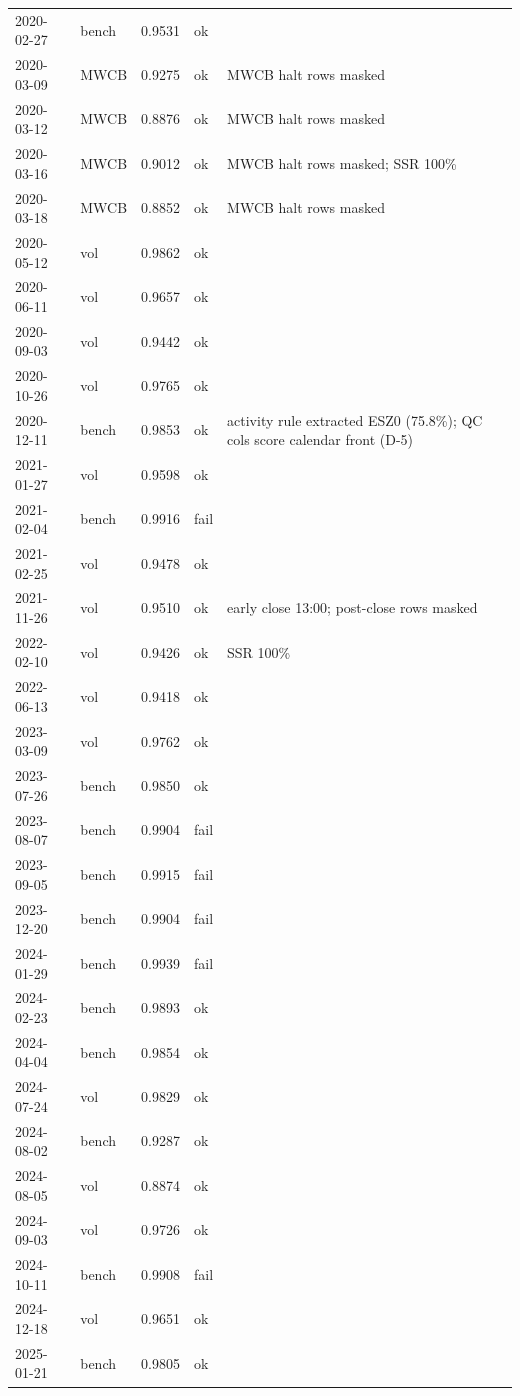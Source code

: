 \begin{table}[htbp]
\begin{tabular}{lllll}
2020-02-27 & bench & 0.9531 & ok &  \\
2020-03-09 & MWCB & 0.9275 & ok & MWCB halt rows masked \\
2020-03-12 & MWCB & 0.8876 & ok & MWCB halt rows masked \\
2020-03-16 & MWCB & 0.9012 & ok & MWCB halt rows masked; SSR 100\% \\
2020-03-18 & MWCB & 0.8852 & ok & MWCB halt rows masked \\
2020-05-12 & vol & 0.9862 & ok &  \\
2020-06-11 & vol & 0.9657 & ok &  \\
2020-09-03 & vol & 0.9442 & ok &  \\
2020-10-26 & vol & 0.9765 & ok &  \\
2020-12-11 & bench & 0.9853 & ok & activity rule extracted ESZ0 (75.8\%); QC cols score calendar front (D-5) \\
2021-01-27 & vol & 0.9598 & ok &  \\
2021-02-04 & bench & 0.9916 & fail &  \\
2021-02-25 & vol & 0.9478 & ok &  \\
2021-11-26 & vol & 0.9510 & ok & early close 13:00; post-close rows masked \\
2022-02-10 & vol & 0.9426 & ok & SSR 100\% \\
2022-06-13 & vol & 0.9418 & ok &  \\
2023-03-09 & vol & 0.9762 & ok &  \\
2023-07-26 & bench & 0.9850 & ok &  \\
2023-08-07 & bench & 0.9904 & fail &  \\
2023-09-05 & bench & 0.9915 & fail &  \\
2023-12-20 & bench & 0.9904 & fail &  \\
2024-01-29 & bench & 0.9939 & fail &  \\
2024-02-23 & bench & 0.9893 & ok &  \\
2024-04-04 & bench & 0.9854 & ok &  \\
2024-07-24 & vol & 0.9829 & ok &  \\
2024-08-02 & bench & 0.9287 & ok &  \\
2024-08-05 & vol & 0.8874 & ok &  \\
2024-09-03 & vol & 0.9726 & ok &  \\
2024-10-11 & bench & 0.9908 & fail &  \\
2024-12-18 & vol & 0.9651 & ok &  \\
2025-01-21 & bench & 0.9805 & ok &  \\

\end{tabular}
\end{table}
